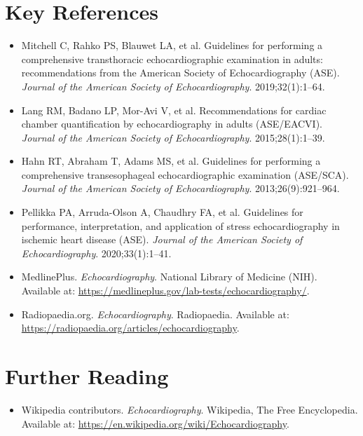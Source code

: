 \section{Key References}
\begin{itemize}
\item Mitchell C, Rahko PS, Blauwet LA, et al. Guidelines for performing a comprehensive transthoracic echocardiographic examination in adults: recommendations from the American Society of Echocardiography (ASE). \textit{Journal of the American Society of Echocardiography}. 2019;32(1):1--64.
\item Lang RM, Badano LP, Mor-Avi V, et al. Recommendations for cardiac chamber quantification by echocardiography in adults (ASE/EACVI). \textit{Journal of the American Society of Echocardiography}. 2015;28(1):1--39.
\item Hahn RT, Abraham T, Adams MS, et al. Guidelines for performing a comprehensive transesophageal echocardiographic examination (ASE/SCA). \textit{Journal of the American Society of Echocardiography}. 2013;26(9):921--964.
\item Pellikka PA, Arruda-Olson A, Chaudhry FA, et al. Guidelines for performance, interpretation, and application of stress echocardiography in ischemic heart disease (ASE). \textit{Journal of the American Society of Echocardiography}. 2020;33(1):1--41.
\item MedlinePlus. \textit{Echocardiography}. National Library of Medicine (NIH). Available at: \url{https://medlineplus.gov/lab-tests/echocardiography/}.
\item Radiopaedia.org. \textit{Echocardiography}. Radiopaedia. Available at: \url{https://radiopaedia.org/articles/echocardiography}.
\end{itemize}

\section{Further Reading}
\begin{itemize}
  \item Wikipedia contributors. \textit{Echocardiography}. Wikipedia, The Free Encyclopedia. Available at: \url{https://en.wikipedia.org/wiki/Echocardiography}.
\end{itemize}
